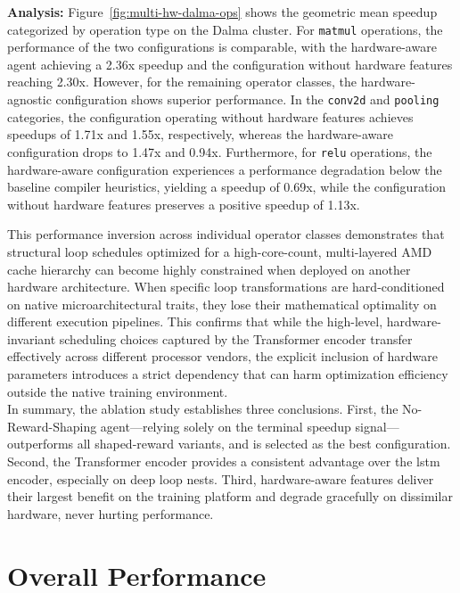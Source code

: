 \textbf{Analysis:} Figure~\ref{fig:multi-hw-dalma-ops} shows the geometric mean speedup categorized by operation type on the Dalma cluster. For \texttt{matmul} operations, the performance of the two configurations is comparable, with the hardware-aware agent achieving a 2.36x speedup and the configuration without hardware features reaching 2.30x. However, for the remaining operator classes, the hardware-agnostic configuration shows superior performance. In the \texttt{conv2d} and \texttt{pooling} categories, the configuration operating without hardware features achieves speedups of 1.71x and 1.55x, respectively, whereas the hardware-aware configuration drops to 1.47x and 0.94x. Furthermore, for \texttt{relu} operations, the hardware-aware configuration experiences a performance degradation below the baseline compiler heuristics, yielding a speedup of 0.69x, while the configuration without hardware features preserves a positive speedup of 1.13x.

This performance inversion across individual operator classes demonstrates that structural loop schedules optimized for a high-core-count, multi-layered AMD cache hierarchy can become highly constrained when deployed on another hardware architecture. When specific loop transformations are hard-conditioned on native microarchitectural traits, they lose their mathematical optimality on different execution pipelines. This confirms that while the high-level, hardware-invariant scheduling choices captured by the Transformer encoder transfer effectively across different processor vendors, the explicit inclusion of hardware parameters introduces a strict dependency that can harm optimization efficiency outside the native training environment. \\

In summary, the ablation study establishes three conclusions. First, the No-Reward-Shaping agent---relying solely on the terminal speedup signal---outperforms all shaped-reward variants, and is selected as the best configuration. Second, the Transformer encoder provides a consistent advantage over the \gls{lstm} encoder, especially on deep loop nests. Third, hardware-aware features deliver their largest benefit on the training platform and degrade gracefully on dissimilar hardware, never hurting performance.

\section{Overall Performance}
\label{sec:overall-performance}

